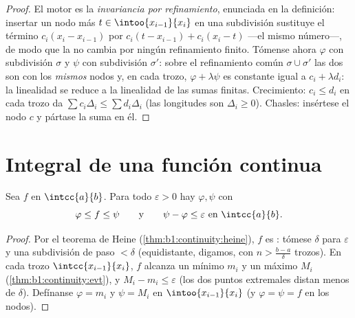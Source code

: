 \begin{proof}
El motor es la \emph{invariancia por refinamiento}, enunciada en la
definición: insertar un nodo más $t \in \intoo{x_{i-1}}{x_i}$ en una
subdivisión sustituye el término $c_i(x_i - x_{i-1})$ por
$c_i(t - x_{i-1}) + c_i(x_i - t)$ ---el mismo número---, de modo que
la  no cambia por ningún refinamiento finito. Tómense ahora
$\varphi$ con subdivisión $\sigma$ y $\psi$ con subdivisión
$\sigma'$: sobre el refinamiento común $\sigma \cup \sigma'$ las dos
son  con los \emph{mismos} nodos y, en cada
trozo, $\varphi + \lambda\psi$ es constante igual a
$c_i + \lambda d_i$: la linealidad se reduce a la linealidad de las
sumas finitas. Crecimiento: $c_i \leq d_i$ en cada trozo da
$\sum c_i \Delta_i \leq \sum d_i \Delta_i$ (las longitudes son
$\Delta_i \geq 0$). Chasles: insértese el nodo $c$ y pártase la suma
en él.
\end{proof}

\section{Integral de una función continua}

\begin{theorem}\label{thm:b1:integration:approx}
Sea $f$  en $\intcc{a}{b}$. Para todo $\varepsilon > 0$ hay
 $\varphi, \psi$ con
\[
\varphi \leq f \leq \psi
\qquad\text{y}\qquad
\psi - \varphi \leq \varepsilon \text{ en } \intcc{a}{b}.
\]
\end{theorem}

\begin{proof}
Por el teorema de Heine (\cref{thm:b1:continuity:heine}), $f$ es
: tómese $\delta$ para $\varepsilon$ y una
subdivisión de paso $< \delta$ (equidistante, digamos, con
$n > \frac{b - a}{\delta}$ trozos). En cada trozo 
$\intcc{x_{i-1}}{x_i}$, $f$ alcanza un mínimo $m_i$ y un máximo $M_i$
(\cref{thm:b1:continuity:evt}), y $M_i - m_i \leq \varepsilon$ (los
dos puntos extremales distan menos de $\delta$). Defínanse
$\varphi = m_i$ y $\psi = M_i$ en $\intoo{x_{i-1}}{x_i}$ (y
$\varphi = \psi = f$ en los nodos).
\end{proof}

